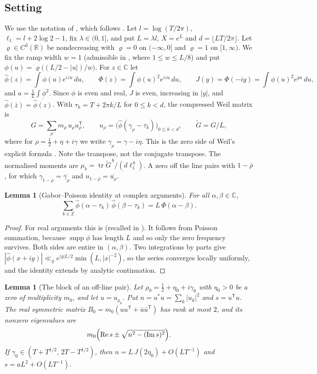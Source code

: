\documentclass[reqno,11pt]{amsart}
\numberwithin{equation}{section}
\theoremstyle{plain}
\newtheorem{lemma}[theorem]{Lemma}
\theoremstyle{remark}
\DeclareMathOperator{\tr}{tr}
\DeclareMathOperator{\Real}{Re}
\DeclareMathOperator{\Imag}{Im}
\begin{document}
\subsection{Setting}
We use the notation of \cite[\S2]{YY26a}, which follows \cite{C26}. Let
$l=\log(T/2\pi)$, $\ell_1=l+2\log2-1$, fix $\lambda\in(0,1]$, and put
$L=\lambda l$, $X=e^{L}$ and $d=\lfloor LT/2\pi\rfloor$. Let
$\varrho\in C^3(\mathbb R)$ be nondecreasing with $\varrho=0$ on $(-\infty,0]$
and $\varrho=1$ on $[1,\infty)$. We fix the ramp width $w=1$ (admissible in
\cite{YY26a}, where $1\le w\le L/8$) and put
$\phi(u)=\varrho\bigl((L/2-|u|)/w\bigr)$. For $z\in\mathbb C$ let
\[
\widehat\phi(z)=\int\phi(u)e^{izu}\,du,\qquad
\Phi(z)=\int\phi(u)^2e^{izu}\,du,\qquad
J(y)=\Phi(-iy)=\int\phi(u)^2e^{yu}\,du,
\]
and $a=\frac1L\int\phi^2$. Since $\phi$ is even and real, $J$ is even,
increasing in $|y|$, and $\widehat\phi(\bar z)=\overline{\widehat\phi(z)}$.
With $\tau_k=T+2\pi k/L$ for $0\le k<d$, the compressed Weil matrix is
\[
G=\sum_{\rho}m_\rho\,u_\rho u_\rho^{\mathsf T},\qquad
u_\rho=\bigl(\widehat\phi(\gamma_\rho-\tau_k)\bigr)_{0\le k<d},\qquad
\widetilde G=G/L,
\]
where for $\rho=\frac12+\eta+i\gamma$ we write $\gamma_\rho=\gamma-i\eta$. This
is the zero side of Weil's explicit formula \cite[\S2.1]{YY26a}. Note the
transpose, not the conjugate transpose. The normalised moments are
$\mu_b=\tr\widetilde G^{\,b}/(d\ell_1^{\,b})$. A zero off the line pairs with
$1-\bar\rho$, for which $\gamma_{1-\bar\rho}=\overline{\gamma_\rho}$ and
$u_{1-\bar\rho}=\overline{u_\rho}$.

\begin{lemma}[Gabor--Poisson identity at complex arguments]\label{lem:poisson}
For all $\alpha,\beta\in\mathbb C$,
\[
\sum_{k\in\mathbb Z}\widehat\phi(\alpha-\tau_k)\,\widehat\phi(\beta-\tau_k)
=L\,\Phi(\alpha-\beta).
\]
\end{lemma}

\begin{proof}
For real arguments this is \cite[Lem.~2.2]{C26} (recalled in \cite[\S2.1]{YY26a}).
It follows from Poisson summation, because $\operatorname{supp}\phi$ has length
$L$ and so only the zero frequency survives. Both sides are entire in
$(\alpha,\beta)$. Two integrations by parts give
$|\widehat\phi(x+iy)|\ll_{\varrho} e^{|y|L/2}\min(L,|x|^{-2})$, so the series
converges locally uniformly, and the identity extends by analytic
continuation.
\end{proof}

\begin{lemma}[The block of an off-line pair]\label{lem:block}
Let $\rho_0=\frac12+\eta_0+i\gamma_0$ with $\eta_0>0$ be a zero of
multiplicity $m_0$, and let $u=u_{\rho_0}$. Put $n=u^{*}u=\sum_k|u_k|^2$ and
$s=u^{\mathsf T}u$. The real symmetric matrix
$B_0=m_0(uu^{\mathsf T}+\bar u\bar u^{\mathsf T})$ has rank at most $2$, and its
nonzero eigenvalues are
\[
m_0\Bigl(\Real s\pm\sqrt{n^2-(\Imag s)^2}\Bigr).
\]
If $\gamma_0\in(T+T^{1/2},\,2T-T^{1/2})$, then
$n=L\,J(2\eta_0)+O(LT^{-1})$ and $s=aL^2+O(LT^{-1})$.
\end{lemma}
\end{document}
